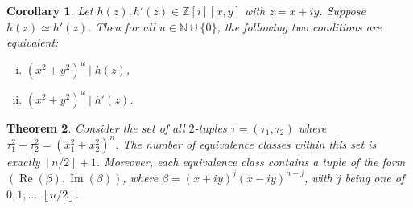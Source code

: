 \documentclass[12pt,table]{article}
\newtheorem{theorem}{Theorem}[section]
\newtheorem{corollary}[theorem]{Corollary}
\theoremstyle{definition}
\theoremstyle{remark}
\newcommand{\Nnn}{\mathbb N}
\newcommand{\Zzz}{\mathbb Z}
\newcommand{\divides}{\mid}
\newcommand{\myfrac}[2]{#1 / #2}
\numberwithin{equation}{section}
\DeclareMathOperator{\Imag}{Im}
\DeclareMathOperator{\Real}{Re}
\begin{document}
\begin{corollary}
\label{corollary_equivalence}
Let $ h(z), h'(z) \in \Zzz[i][x,y] $ with $ z = x+ iy $.
Suppose $ h(z) \simeq h'(z) $. Then for all  $ u \in \Nnn \cup \{ 0 \} $,
the following two conditions are
equivalent:
\begin{enumerate}[i.]
\item $ ( x^2 + y^2 ) ^ u \divides h(z) $,
\item $ ( x^2 + y^2 ) ^ u \divides h'(z) $.
\end{enumerate}
\end{corollary}



\begin{theorem}
\label{thm:2D_equivalence}
Consider the set of all $2$-tuples $ \tau = ( \tau_1, \tau_2 )$ where 
$
  \tau_1 ^ 2   +   \tau_2 ^ 2   
= 
\left(  x_1 ^ 2 + x_2 ^ 2  \right) ^ n 
$.
The number of equivalence classes within this set 
is exactly  $ \left\lfloor \myfrac{n}{2} \right\rfloor + 1 $. 
Moreover, each equivalence class contains a tuple
of the form $ ( \Real( \beta ) , \Imag( \beta ) ) $,
where $ \beta = (x + iy)^j (x -  iy)^{n-j} $,
with $ j $
being one of $ 0, 1, \dotsc, \left\lfloor \myfrac{n}{2} \right\rfloor $.
\end{theorem}
%
\end{document}
